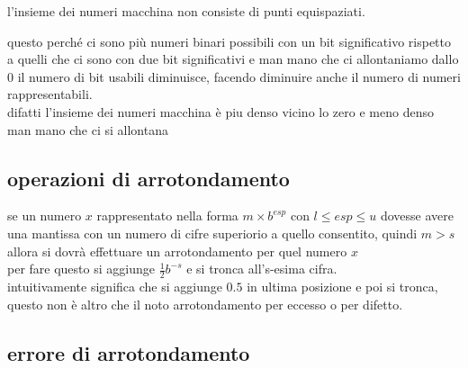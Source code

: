 \documentclass{article}
\begin{document}
\begin{proposition}
  l'insieme dei numeri macchina non consiste di punti equispaziati. 
\end{proposition}
questo perché ci sono più numeri binari possibili con un bit significativo rispetto a quelli che ci sono con due bit significativi e man mano che ci allontaniamo dallo $0$ il numero di bit usabili diminuisce, facendo diminuire anche il numero di numeri rappresentabili. \\
difatti l'insieme dei numeri macchina è piu denso vicino lo zero e meno denso man mano che ci si allontana 
 
\subsection{operazioni di arrotondamento}
se un numero $x$ rappresentato nella forma $m \times b^{esp}$ con $l \leqslant esp \leqslant u$ dovesse avere una mantissa con un numero di cifre superiorio a quello consentito, quindi $m > s$ allora si dovrà effettuare un arrotondamento per quel numero $x$ \\ 
per fare questo si aggiunge $\frac{1 }{2 }b^{-s}$ e si tronca all's-esima cifra. \\
intuitivamente significa che si aggiunge $0.5$ in ultima posizione e poi si tronca, questo non è altro che il noto arrotondamento per eccesso o per difetto.  
\subsection{errore di arrotondamento}
\end{document}
